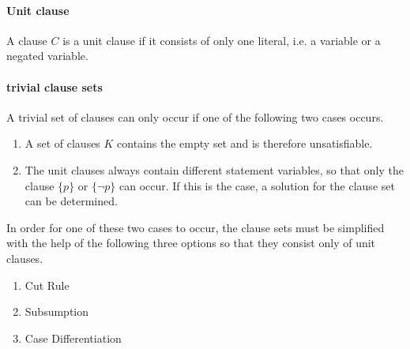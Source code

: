 \paragraph{Unit clause}
A clause $C$ is a unit clause if it consists of only one literal, i.e. a variable or a negated variable.

\paragraph{trivial clause sets}
A trivial set of clauses can only occur if one of the following two cases occurs.

\begin{enumerate}
\item A set of clauses $K$ contains the empty set and is therefore unsatisfiable.
\item The unit clauses always contain different statement variables, so that only the clause $\{p\}$ or $\{\neg p\}$ can occur. If this is the case, a solution for the clause set can be determined.
\end{enumerate}

In order for one of these two cases to occur, the clause sets must be simplified with the help of the following three options so that they consist only of unit clauses.

\begin{enumerate}
\item Cut Rule 
\item Subsumption
\item Case Differentiation
\end{enumerate}

